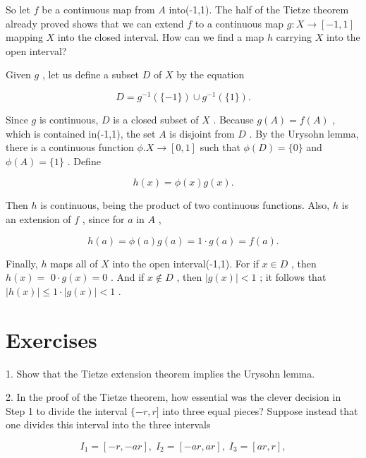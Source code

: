 So let \(f\) be a continuous map from \(A\) into(-1,1). The half of the Tietze theorem already proved shows that we can extend \(f\) to a continuous map \(g : X \rightarrow  \left\lbrack  {-1,1}\right\rbrack\) mapping \(X\) into the closed interval. How can we find a map \(h\) carrying \(X\) into the open interval?

Given \(g\) , let us define a subset \(D\) of \(X\) by the equation

\[
D = {g}^{-1}\left( {\{  - 1\} }\right)  \cup  {g}^{-1}\left( {\{ 1\} }\right) .
\]

Since \(g\) is continuous, \(D\) is a closed subset of \(X\) . Because \(g\left( A\right)  = f\left( A\right)\) , which is contained in(-1,1), the set \(A\) is disjoint from \(D\) . By the Urysohn lemma, there is a continuous function \(\phi .X \rightarrow  \left\lbrack  {0,1}\right\rbrack\) such that \(\phi \left( D\right)  = \{ 0\}\) and \(\phi \left( A\right)  = \{ 1\}\) . Define

\[
h\left( x\right)  = \phi \left( x\right) g\left( x\right) .
\]

Then \(h\) is continuous, being the product of two continuous functions. Also, \(h\) is an extension of \(f\) , since for \(a\) in \(A\) ,

\[
h\left( a\right)  = \phi \left( a\right) g\left( a\right)  = 1 \cdot  g\left( a\right)  = f\left( a\right) .
\]

Finally, \(h\) maps all of \(X\) into the open interval(-1,1). For if \(x \in  D\) , then \(h\left( x\right)  =\)  \(0 \cdot  g\left( x\right)  = 0\) . And if \(x \notin  D\) , then \(\left| {g\left( x\right) }\right|  < 1\) ; it follows that \(\left| {h\left( x\right) }\right|  \leq  1 \cdot  \left| {g\left( x\right) }\right|  < 1\) .

\section*{Exercises}

1. Show that the Tietze extension theorem implies the Urysohn lemma.

2. In the proof of the Tietze theorem, how essential was the clever decision in Step 1 to divide the interval \(\{  - r,r\rbrack\) into three equal pieces? Suppose instead that one divides this interval into the three intervals

\[
{I}_{1} = \left\lbrack  {-r, - {ar}}\right\rbrack  ,\;{I}_{2} = \left\lbrack  {-{ar},{ar}}\right\rbrack  ,\;{I}_{3} = \left\lbrack  {{ar},r}\right\rbrack  ,
\]

